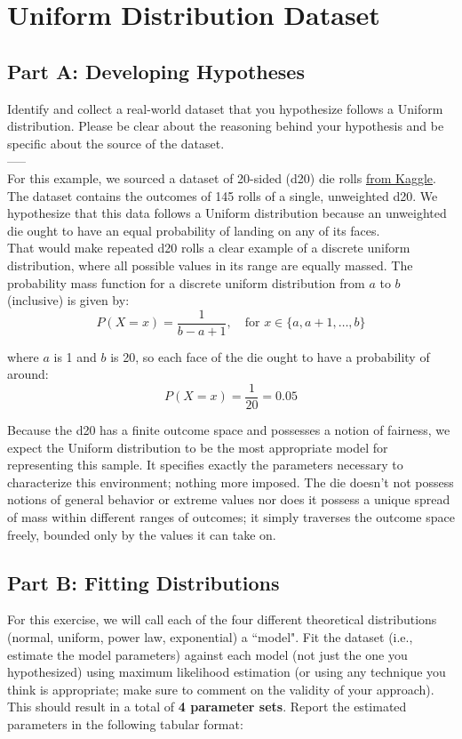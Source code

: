 \section{Uniform Distribution Dataset}

\subsection{Part A: Developing Hypotheses}
Identify and collect a real-world dataset that you hypothesize follows a Uniform distribution. Please be clear about the reasoning behind your hypothesis and be specific about the source of the dataset.\\
-----\\
For this example, we sourced a dataset of 20-sided (d20) die rolls \hyperlink{https://www.kaggle.com/datasets/devocorum/d20-rolls}{from Kaggle}. The dataset contains the outcomes of 145 rolls of a single, unweighted d20. We hypothesize that this data follows a Uniform distribution because an unweighted die ought to have an equal probability of landing on any of its faces.\\

That would make repeated d20 rolls a clear example of a discrete uniform distribution, where all possible values in its range are equally massed. The probability mass function for a discrete uniform distribution from \( a \) to \( b \) (inclusive) is given by:\\

$$
P(X = x) = \frac{1}{b - a + 1}, \quad \text{for } x \in \{a, a+1, \ldots, b\}
$$

where $ a $ is 1 and $ b $ is 20, so each face of the die ought to have a probability of around:\\
\[
P(X = x) = \frac{1}{20} = 0.05
\]

Because the d20 has a finite outcome space and possesses a notion of fairness, we expect the Uniform distribution to be the most appropriate model for representing this sample. It specifies exactly the parameters necessary to characterize this environment; nothing more imposed. The die doesn't not possess notions of general behavior or extreme values nor does it possess a unique spread of mass within different ranges of outcomes; it simply traverses the outcome space freely, bounded only by the values it can take on.\\
\newpage

\subsection{Part B: Fitting Distributions}
For this exercise, we will call each of the four different theoretical distributions (normal, uniform, power law, exponential) a ``model". Fit the dataset (i.e., estimate the model parameters) against each model (not just the one you hypothesized) using maximum likelihood estimation (or using any technique you think is appropriate; make sure to comment on the validity of your approach). This should result in a total of \textbf{4 parameter sets}. Report the estimated parameters in the following tabular format:

